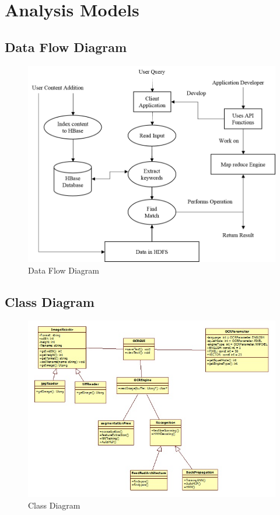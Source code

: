 \section{Analysis Models}

\subsection{Data Flow Diagram}

\begin{figure}[h]
\begin{center}
\includegraphics{data_flow}
\end{center}
\caption{Data Flow Diagram}
\end{figure}

\subsection{Class Diagram}

\begin{figure}[h]
\begin{center}
\includegraphics[scale=1]{class.jpg}
\end{center}
\caption{Class Diagram}
\end{figure}

